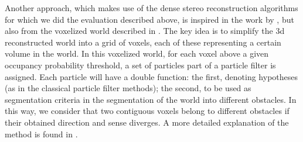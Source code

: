 
Another approach, which makes use of the dense stereo reconstruction algorithms for which we did the evaluation described above, is inspired in the work by \cite{danescu2012particle}, but also from the voxelized world described in \cite{broggi2013}. The key idea is to simplify the 3d reconstructed world into a grid of voxels, each of these representing a certain volume in the world. In this voxelized world, for each voxel above a given occupancy probability threshold, a set of particles part of a particle filter is assigned. Each particle will have a double function: the first, denoting hypotheses (as in the classical particle filter methods); the second, to be used as segmentation criteria in the segmentation of the world into different obstacles. In this way, we consider that two contiguous voxels belong to different obstacles if their obtained direction and sense diverges. A more detailed explanation of the method is found in \todo{\ref{XXX}}.

